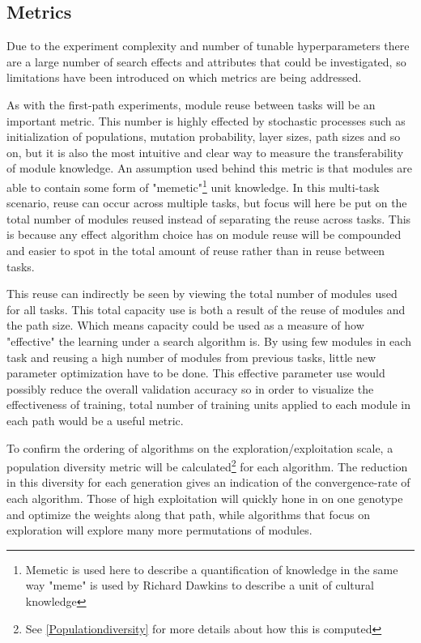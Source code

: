 \subsection{Metrics}\label{Search-experiment:Metrics}
Due to the experiment complexity and number of tunable hyperparameters there are a large number of search effects and attributes that could be investigated, so limitations have been introduced on which metrics are being addressed. 

As with the first-path experiments, module reuse between tasks will be an important metric. This number is highly effected by stochastic processes such as initialization of populations, mutation probability, layer sizes, path sizes and so on, but it is also the most intuitive and clear way to measure the transferability of module knowledge. An assumption used behind this metric is that modules are able to contain some form of "memetic"\footnote{Memetic is used here to describe a quantification of knowledge in the same way "meme" is used by Richard Dawkins\cite{selfishGene} to describe a unit of cultural knowledge} unit knowledge. In this multi-task scenario, reuse can occur across multiple tasks, but focus will here be put on the total number of modules reused instead of separating the reuse across tasks. This is because any effect algorithm choice has on module reuse will be compounded and easier to spot in the total amount of reuse rather than in reuse between tasks.

This reuse can indirectly be seen by viewing the total number of modules used for all tasks. This total capacity use is both a result of the reuse of modules and the path size. Which means capacity could be used as a measure of how "effective" the learning under a search algorithm is. By using few modules in each task and reusing a high number of modules from previous tasks, little new parameter optimization have to be done. This effective parameter use would possibly reduce the overall validation accuracy so in order to visualize the effectiveness of training, total number of training units applied to each module in each path would be a useful metric. 

To confirm the ordering of algorithms on the exploration/exploitation scale, a population diversity metric will be calculated\footnote{See \ref{Populationdiversity} for more details about how this is computed} for each algorithm. The reduction in this diversity for each generation gives an indication of the convergence-rate of each algorithm. Those of high exploitation will quickly hone in on one genotype and optimize the weights along that path, while algorithms that focus on exploration will explore many more permutations of modules. 

